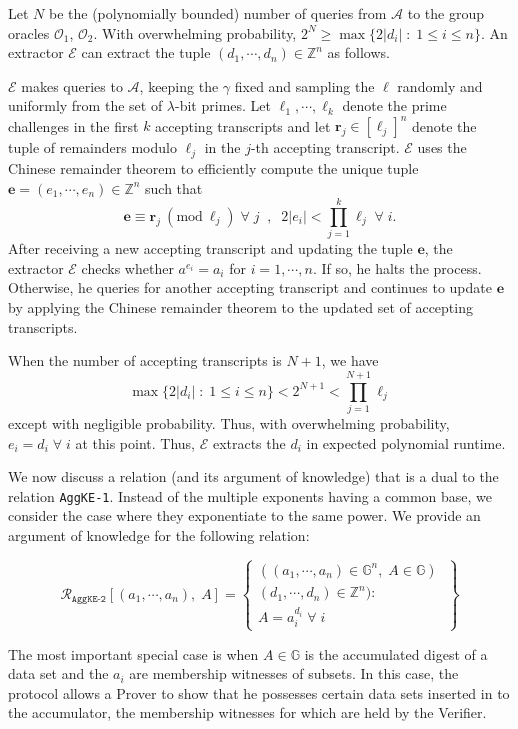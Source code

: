 \documentclass[11pt, lettersize, notitlepage, leqno, footskip=0.6cm]{article}
\newcommand{\bz}{\mathbb Z}
\newcommand{\pl}{\prod\limits}
\newcommand{\ttt}{\texttt}
\newcommand{\bG}{\mathbb{G}}
\newcommand{\mc}{\mathcal}
\newcommand{\mb}{\mathbb}
\newcommand{\mbf}{\mathbf}
\newcommand{\lam}{\lambda}
\newcommand{\A}{\mc{A}}
\newcommand{\vs}{\vspace{-0.15cm}}
\newcommand{\op}{overwhelming probability}
\newcommand{\np}{negligible probability}
\newcommand{\Mod}[1]{\ (\mathrm{mod}\ #1)}
\newcommand{\E}{\mc{E}}
\numberwithin{equation}{section}
\begin{document}
\begin{prf}
Let $N$ be the (polynomially bounded) number of queries from $\A$ to the group oracles $\mc{O}_1$, $\mc{O}_2$. With \op, $2^{N} \geq \max\{2|d_i|\;:\;1\leq i\leq n \}$. An extractor $\E$ can extract the tuple $(d_1,\cdots,d_n)\in\bz^n$ as follows. 

$\E$ makes queries to $\A$, keeping the $\gamma$ fixed and sampling the $\ell$ randomly and uniformly from the set of $\lam$-bit primes. Let $\ell_1,\cdots,\ell_{k}$ denote the prime challenges in the first $k$ accepting transcripts and let $\mbf{r}_j\in [\ell_j]^n$ denote the tuple of remainders modulo $\ell_j$ in the $j$-th accepting transcript. $\E$ uses the Chinese remainder theorem to efficiently compute the unique tuple $\mbf{e} = (e_1,\cdots,e_n)\in \bz^n$ such that \vs $$\mbf{e}\equiv \mbf{r}_j\Mod{\ell_j}\;\forall\; j\;\;,\;\;2|e_i|< \pl_{j=1}^{k} \ell_j\;\forall\; i.$$ After receiving a new accepting transcript and updating the tuple $\mbf{e}$, the extractor $\E$ checks whether $a^{e_i} = a_i$ for $i=1,\cdots,n$. If so, he halts the process. Otherwise, he queries for another accepting transcript and continues to update $\mbf{e}$ by applying the Chinese remainder theorem to the updated set of accepting transcripts.

When the number of accepting transcripts is $N+1$, we have \vs $$\max\{2|d_i|\;:\;1\leq i\leq n \} < 2^{N+1} < \pl_{j=1}^{N+1}\ell_j$$ except with \np. Thus, with \op, $e_i = d_i\;\forall\;i$ at this point. Thus, $\E$ extracts the $d_i$ in expected polynomial runtime.\end{prf} 

\vspace{0.2cm}

\noindent We now discuss a relation (and its argument of knowledge) that is a dual to the relation \verb|AggKE-1|. Instead of the multiple exponents having a common base, we consider the case where they exponentiate to the same power. We provide an argument of knowledge for the following relation: 

\[
  \mc{R}_{{\ttt{AggKE-2}}}[(a_1,\cdots, a_n),\;A] = \left\{\begin{array}{l}
    ((a_1,\cdots, a_n)\in \mb{G}^n,\; A\in\mb{G})\;\\ 
    (d_1,\cdots,d_n)\in\bz^n) :  \\
     A = a_i^{d_i}\;\forall\; i
  \end{array}\right\}
\]
\vspace{0.1cm}

The most important special case is when $A\in\bG$ is the accumulated digest of a data set and the $a_i$ are membership witnesses of subsets. In this case, the protocol allows a Prover to show that he possesses certain data sets inserted in to the accumulator, the membership witnesses for which are held by the Verifier.
\end{document}
